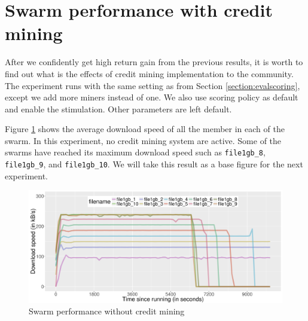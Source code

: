 \section{Swarm performance with credit mining}
\label{section:swperf}
After we confidently get high return gain from the previous results, it is worth to find out what is the effects of credit mining implementation to the community. The experiment runs with the same setting as from Section \ref{section:evalscoring}, except we add more miners instead of one. We also use scoring policy as default and enable the stimulation. Other parameters are left default. 

Figure \ref{fig:swarmnocmperf} shows the average download speed of all the member in each of the swarm. In this experiment, no credit mining system are active. Some of the swarms have reached its maximum download speed such as \texttt{file1gb\_8}, \texttt{file1gb\_9}, and \texttt{file1gb\_10}. We will take this result as a base figure for the next experiment.

\begin{figure}[h]
	\centering
	\includegraphics[width=\textwidth]{pics/results/swperf_n2.png}
	\caption{Swarm performance without credit mining}
	\label{fig:swarmnocmperf}
\end{figure}


